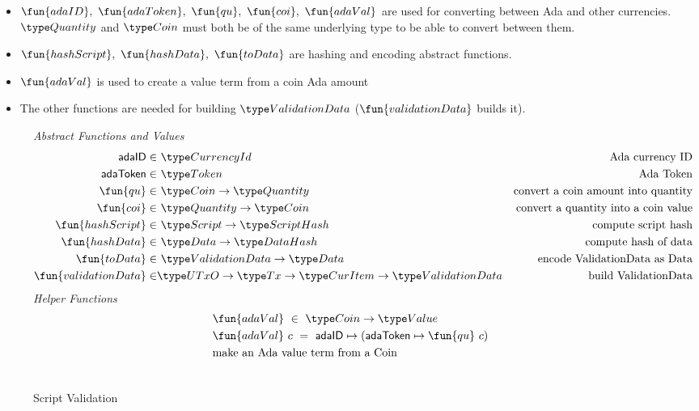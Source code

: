 \begin{itemize}
  \item $\fun{adaID},~\fun{adaToken},~\fun{qu},~\fun{coi},~\fun{adaVal}$ are used
  for converting between Ada and other currencies. $\Quantity$ and $\Coin$
  must both be of the same underlying type to be able to convert between them.
  \item $\fun{hashScript},~ \fun{hashData},~\fun{toData}$ are hashing and encoding
  abstract functions.
  \item $\fun{adaVal}$ is used to create a value term from a coin Ada amount
  \item The other functions are needed for building $\ValidationData$
  ($\fun{validationData}$ builds it).
\end{itemize}

\begin{figure*}[htb]
  \emph{Abstract Functions and Values}
  \begin{align*}
    \mathsf{adaID} \in& ~\CurrencyId
    & \text{Ada currency ID} \\
    \mathsf{adaToken} \in& ~\Token
    & \text{Ada Token} \\
    \fun{qu} \in& ~\Coin \to \Quantity
    & \text{convert a coin amount into quantity} \\
    \fun{coi} \in& ~\Quantity \to \Coin
    & \text{convert a quantity into a coin value} \\
    \fun{hashScript} \in & ~\Script\to \HashScr
    & \text{compute script hash} \\
    \fun{hashData} \in & ~\Data \to \HashDat
    & \text{compute hash of data} \\
    \fun{toData} \in & ~ \ValidationData\to \Data
    & \text{encode ValidationData as Data} \\
    \fun{validationData} \in & \UTxO \to \Tx \to \CurItem \to \ValidationData
    & \text{build ValidationData} \\
  \end{align*}
  \emph{Helper Functions}
  \begin{align*}
    &\fun{adaVal} ~\in~ \Coin \to \Value \\
    &\fun{adaVal}~{c} ~=~ \mathsf{adaID} \mapsto (\mathsf{adaToken} \mapsto  \fun{qu}~c) \\
    & \text{make an Ada value term from a Coin} \\~\\
  \end{align*}
  \caption{Script Validation}
  \label{fig:defs:functions-helper}
\end{figure*}


